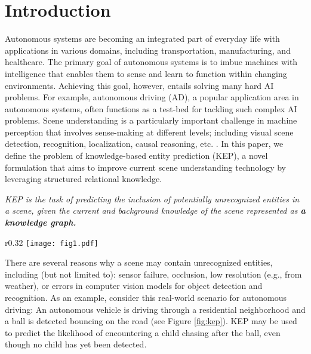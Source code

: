 \documentclass[conference]{IEEEtran}
\begin{document}
\section{Introduction}
\label{sec:intro}
Autonomous systems are becoming an integrated part of everyday life with applications in various domains, including transportation, manufacturing, and healthcare. The primary goal of autonomous systems is to imbue machines with intelligence that enables them to sense and learn to function within changing environments. Achieving this goal, however, entails solving many hard AI problems. For example, autonomous driving (AD), a popular application area in autonomous systems, often functions as a test-bed for tackling such complex AI problems. Scene understanding is a particularly important challenge in machine perception that involves sense-making at different levels; including visual scene detection, recognition, localization, causal reasoning, etc. \cite{ramanishka2018toward}. In this paper, we define the problem of knowledge-based entity prediction (KEP), a novel formulation that aims to improve current scene understanding technology by leveraging structured relational knowledge.\\


\begin{tcolorbox}[title=KEP Definition]
\textit{KEP is the task of predicting the inclusion of potentially unrecognized entities in a scene, given the current and background knowledge of the scene represented as \textbf{a knowledge graph.}}
\end{tcolorbox}

\begin{wrapfigure}{r}{0.32\textwidth}
    \centering
    \texttt{[image: fig1.pdf]}
    \caption{Knowledge-based Entity Prediction Problem in AD}
    \label{fig:kep}
\end{wrapfigure}

There are several reasons why a scene may contain unrecognized entities, including (but not limited to): sensor failure, occlusion, low resolution (e.g., from weather), or errors in computer vision models for object detection and recognition. As an example, consider this real-world scenario for autonomous driving: An autonomous vehicle is driving through a residential neighborhood and a ball is detected bouncing on the road (see Figure \ref{fig:kep}). KEP may be used to predict the likelihood of encountering a child chasing after the ball, even though no child has yet been detected.
\end{document}
